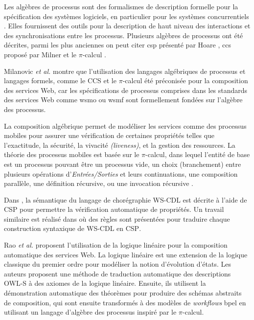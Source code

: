   Les algèbres de processus sont des formalismes de description
  formelle pour la spécification des systèmes logiciels, en particulier
  pour les systèmes concurrentiels \cite{dumez2010approche}. Elles
  fournissent des outils pour la description de haut niveau des
  interactions et des synchronisations entre les processus. Plusieurs
  algèbres de processus ont été décrites, parmi les plus anciennes on
  peut citer \acrshort{csp} présenté par Hoare
  \cite{hoare1978communicating}, \acrshort{ccs} proposé par
  Milner \cite{milner1982finite, milner1989communication} et le
  $\pi$-calcul \cite{milner1992calculus}.\medskip

  Milanovic \textit{et al.} \cite{milanovic2004current} montre que
  l'utilisation des langages algébriques de processus et langages
  formels, comme le \textsc{CCS} et le $\pi$-calcul été préconisée
  pour la composition des services Web, car les spécifications de
  processus comprises dans les standards des services Web comme
  \acrshort{wsmo} ou \acrshort{wsmf} sont formellement fondées sur
  l'algèbre des processus.\medskip

  La composition algébrique permet de modéliser les services comme des
  processus mobiles pour assurer une vérification de certaines
  propriétés telles que l'exactitude, la sécurité, la vivacité
  \textit{(liveness)}, et la gestion des ressources. La théorie des
  processus mobiles est basée sur le $\pi$-calcul, dans lequel
  l'entité de base est un processus pouvant être un processus vide,
  un choix (branchement) entre plusieurs opérations
  d'\textit{Entrées/Sorties} et leurs continuations, une composition
  parallèle, une définition récursive, ou une invocation récursive
  \cite{zahirathesis2008}.\medskip

  Dans \cite{koshkina2004modelling}, la sémantique du langage de
  chorégraphie \textsc{WS-CDL} est décrite à l'aide de \textsc{CSP}
  pour permettre la vérification automatique de propriétés. Un
  travail similaire est réalisé dans \cite{li2007modeling} où des
  règles sont présentées pour traduire chaque construction syntaxique
  de \textsc{WS-CDL} en \textsc{CSP}.\medskip

  Rao \textit{et al.} \cite{rao2004logic} proposent l'utilisation de
  la logique linéaire pour la composition automatique des services
  Web. La logique linéaire est une extension de la logique classique
  du premier ordre pour modéliser la notion d'évolution d'états. Les
  auteurs proposent une méthode de traduction automatique des
  descriptions \textsc{OWL-S} à des axiomes de la logique
  linéaire. Ensuite, ils utilisent la démonstration automatique des
  théorèmes pour produire des schémas abstraits de composition, qui
  sont ensuite transformés à des modèles de \textit{workflows}
  \acrshort{bpel} en utilisant un langage d'algèbre des processus
  inspiré par le $\pi$-calcul.\medskip

